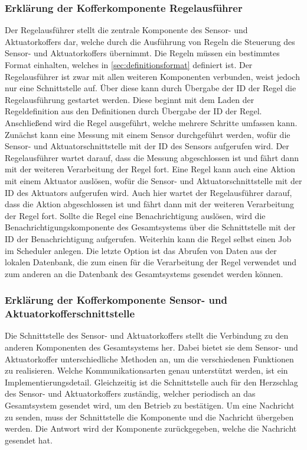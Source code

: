 \subsubsection{Erklärung der Kofferkomponente Regelausführer}
Der Regelausführer stellt die zentrale Komponente des Sensor- und Aktuatorkoffers dar, welche durch die Ausführung von Regeln die Steuerung des Sensor- und Aktuatorkoffers übernimmt.
Die Regeln müssen ein bestimmtes Format einhalten, welches in \cref{sec:definitionsformat} definiert ist.
Der Regelausführer ist zwar mit allen weiteren Komponenten verbunden, weist jedoch nur eine Schnittstelle auf.
Über diese kann durch Übergabe der ID der Regel die Regelausführung gestartet werden.
Diese beginnt mit dem Laden der Regeldefinition aus den Definitionen durch Übergabe der ID der Regel.
Anschließend wird die Regel ausgeführt, welche mehrere Schritte umfassen kann.
Zunächst kann eine Messung mit einem Sensor durchgeführt werden, wofür die Sensor- und Aktuatorschnittstelle mit der ID des Sensors aufgerufen wird.
Der Regelausführer wartet darauf, dass die Messung abgeschlossen ist und fährt dann mit der weiteren Verarbeitung der Regel fort.
Eine Regel kann auch eine Aktion mit einem Aktuator auslösen, wofür die Sensor- und Aktuatorschnittstelle mit der ID des Aktuators aufgerufen wird.
Auch hier wartet der Regelausführer darauf, dass die Aktion abgeschlossen ist und fährt dann mit der weiteren Verarbeitung der Regel fort.
Sollte die Regel eine Benachrichtigung auslösen, wird die Benachrichtigungskomponente des Gesamtsystems über die Schnittstelle mit der ID der Benachrichtigung aufgerufen.
Weiterhin kann die Regel selbst einen Job im Scheduler anlegen.
Die letzte Option ist das Abrufen von Daten aus der lokalen Datenbank, die zum einen für die Verarbeitung der Regel verwendet und zum anderen an die Datenbank des Gesamtsystems gesendet werden können.

\subsubsection{Erklärung der Kofferkomponente Sensor- und Aktuatorkofferschnittstelle}
Die Schnittstelle des Sensor- und Aktuatorkoffers stellt die Verbindung zu den anderen Komponenten des Gesamtsystems her.
Dabei bietet sie dem Sensor- und Aktuatorkoffer unterschiedliche Methoden an, um die verschiedenen Funktionen zu realisieren.
Welche Kommunikationsarten genau unterstützt werden, ist ein Implementierungsdetail.
Gleichzeitig ist die Schnittstelle auch für den Herzschlag des Sensor- und Aktuatorkoffers zuständig, welcher periodisch an das Gesamtsystem gesendet wird, um den Betrieb zu bestätigen.
Um eine Nachricht zu senden, muss der Schnittstelle die Komponente und die Nachricht übergeben werden.
Die Antwort wird der Komponente zurückgegeben, welche die Nachricht gesendet hat.

